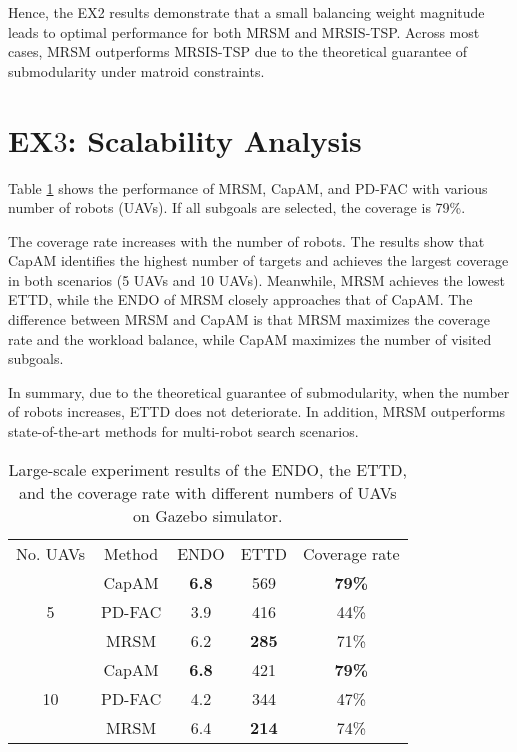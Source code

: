 Hence, the EX2 results demonstrate that a small balancing weight magnitude leads to optimal performance for both MRSM and MRSIS-TSP\cite{li2024mrsis}. Across most cases, MRSM outperforms MRSIS-TSP\cite{li2024mrsis} due to the theoretical guarantee of submodularity under matroid constraints.


\section{EX$3$: Scalability Analysis}
Table \ref{tab:large-scale} shows the performance of MRSM, CapAM\cite{paull2022learning}, and PD-FAC\cite{sheng2022pd} with various number of robots (UAVs). If all subgoals are selected, the coverage is 79\%.

The coverage rate increases with the number of robots. The results show that CapAM\cite{paull2022learning} identifies the highest number of targets and achieves the largest coverage in both scenarios (5 UAVs and 10 UAVs).
Meanwhile, MRSM achieves the lowest ETTD, while the ENDO of MRSM closely approaches that of CapAM\cite{paull2022learning}. The difference between MRSM and CapAM\cite{paull2022learning} is that MRSM maximizes the coverage rate and the workload balance, while CapAM\cite{paull2022learning} maximizes the number of visited subgoals.

In summary, due to the theoretical guarantee of submodularity, when the number of robots increases, ETTD does not deteriorate. In addition, MRSM outperforms state-of-the-art methods for multi-robot search scenarios.

\begin{table}[]
\centering
\caption{Large-scale experiment results of the ENDO, the ETTD, and the coverage rate with different numbers of UAVs on Gazebo simulator.}
\label{tab:large-scale}
\begin{tabular}{|c|c|c|c|c|}
\hline
\multirow{2}{*}{No. UAVs} & \multirow{2}{*}{Method} & \multirow{2}{*}{ENDO} & \multirow{2}{*}{ETTD} & \multirow{2}{*}{Coverage rate} \\
                    &        &  &           &           \\ \hline\hline
\multirow{3}{*}{5}  & CapAM\cite{paull2022learning}  & \textbf{6.8} & 569 & \textbf{79\%} \\ \cline{2-5}
                    & PD-FAC\cite{sheng2022pd} & 3.9 & 416 & 44\% \\ \cline{2-5}
                    & MRSM   & 6.2 & \textbf{285} & 71\% \\ \hline\hline
\multirow{3}{*}{10} & CapAM\cite{paull2022learning}  & \textbf{6.8} & 421 & \textbf{79\%} \\ \cline{2-5}
                    & PD-FAC\cite{sheng2022pd} & 4.2 & 344 & 47\% \\ \cline{2-5}
                    & MRSM   & 6.4 & \textbf{214} & 74\% \\ \hline
\end{tabular}
\end{table}
